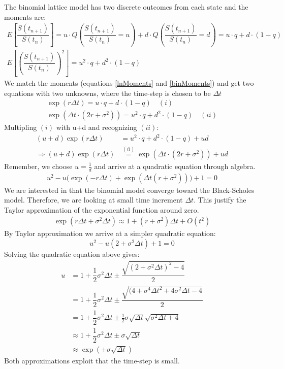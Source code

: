 The binomial lattice model has two discrete outcomes from each state and the moments are:
\begin{equation}\label{binMoments}
\begin{split}
E[\dfrac{S(t_{n+1})}{S(t_{n})}]=u \cdot Q(\dfrac{S(t_{n+1})}{S(t_{n})} = u) + d \cdot Q(\dfrac{S(t_{n+1})}{S(t_{n})} = d) = u \cdot q + d \cdot (1-q)\\
E[(\dfrac{S(t_{n+1})}{S(t_{n})})^2]=u^2 \cdot q + d^2 \cdot (1-q)
\end{split}
\end{equation}
We match the moments (equations \eqref{lnMoments} and \eqref{binMoments}) and get two equations with two unknowns, where the time-step is chosen to be $\Delta t$
\begin{align*}
\exp(r \Delta t)=u \cdot q + d \cdot (1-q) \quad (i)\\
\exp(\Delta t \cdot (2r + \sigma^2))=u^2 \cdot q + d^2 \cdot (1-q) \quad (ii)
\end{align*}
Multipling $(i)$ with u+d and recognizing $(ii)$:
\begin{align*}
(u+d)\exp(r \Delta t)&=u^2 \cdot q + d^2 \cdot (1-q) + ud\\
\Rightarrow (u+d)\exp(r \Delta t)&\overset{(ii)}{=}\exp(\Delta t \cdot (2r + \sigma^2)) + u d
\end{align*}
Remember, we choose $u= \frac{1}{d}$ and arrive at a quadratic equation through algebra.
\begin{align*}
u^2 - u\bigg(\exp(-r \Delta t) + \exp(\Delta t(r+\sigma^2))\bigg)+1=0
\end{align*}
We are interested in that the binomial model converge toward the Black-Scholes model. Therefore, we are looking at small time increment $\Delta t$. This justify the Taylor approximation of the exponential function around zero.
\begin{align*}
\exp(r \Delta t + \sigma^2 \Delta t) \approx 1 + (r+\sigma^2)\Delta t + O(t^2)
\end{align*}
By Taylor approximation we arrive at a simpler quadratic equation:
\begin{equation*}
u^2-u(2+\sigma^2 \Delta t) + 1 = 0
\end{equation*}
Solving the quadratic equation above gives:
\begin{align*}
u&=1+\dfrac{1}{2} \sigma^2 \Delta t \pm  \dfrac{\sqrt{(2+\sigma^2 \Delta t)^2 - 4}}{2}\\
&=1+\dfrac{1}{2} \sigma^2 \Delta t \pm  \dfrac{\sqrt{(4+\sigma^4 \Delta t^2 + 4 \sigma^2 \Delta t - 4}}{2}\\
&=1+\dfrac{1}{2} \sigma^2 \Delta t \pm \frac{1}{2} \sigma \sqrt{\Delta t} \sqrt{\sigma^2 \Delta t + 4}\\
&\approx 1+\dfrac{1}{2} \sigma^2 \Delta t \pm \sigma \sqrt{\Delta t}\\
&\approx \exp(\pm \sigma \sqrt{\Delta t})
\end{align*}
Both approximations exploit that the time-step is small.

